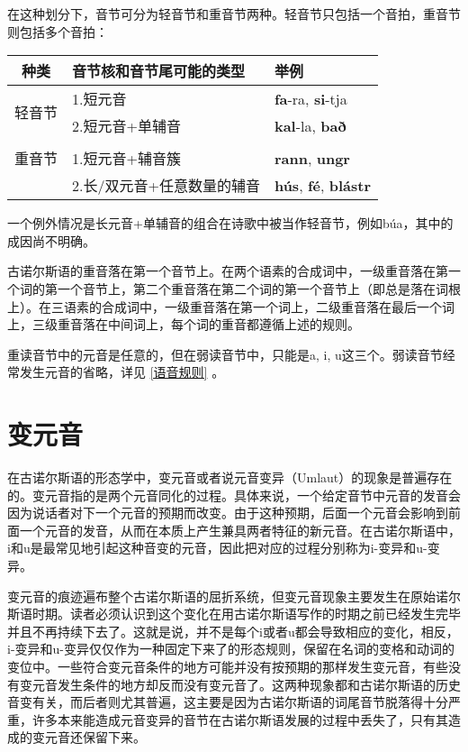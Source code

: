 在这种划分下，音节可分为轻音节和重音节两种。轻音节只包括一个音拍，重音节则包括多个音拍：


\begin{table}[H]
    \centering
    \begin{tabular}{cll}
    \hline
    \textbf{种类}                   & \textbf{音节核和音节尾可能的类型}         & \textbf{举例}                     \\ \hline
    \multirow{2}{*}{轻音节} & 1.短元音                & \textbf{fa}-ra, \textbf{si}-tja \\
                         & 2.短元音+单辅音            & \textbf{kal}-la, \textbf{bað}            \\
    \multicolumn{1}{l}{} & \multicolumn{1}{l}{} & \multicolumn{1}{l}{}   \\
    重音节                  & 1.短元音+辅音簇            & \textbf{rann}, \textbf{ungr}             \\
                         & 2.长/双元音+任意数量的辅音      & \textbf{hús}, \textbf{fé},  \textbf{blástr}               \\ \hline
    \end{tabular}
\end{table}

一个例外情况是长元音+单辅音的组合在诗歌中被当作轻音节，例如búa，其中的成因尚不明确。

古诺尔斯语的重音落在第一个音节上。在两个语素的合成词中，一级重音落在第一个词的第一个音节上，第二个重音落在第二个词的第一个音节上（即总是落在词根上）。在三语素的合成词中，一级重音落在第一个词上，二级重音落在最后一个词上，三级重音落在中间词上，每个词的重音都遵循上述的规则。

重读音节中的元音是任意的，但在弱读音节中，只能是a, i, u这三个。弱读音节经常发生元音的省略，详见 \ref{语音规则} 。

\section{变元音}
\label{变元音}

在古诺尔斯语的形态学中，变元音或者说元音变异（Umlaut）的现象是普遍存在的。变元音指的是两个元音同化的过程。具体来说，一个给定音节中元音的发音会因为说话者对下一个元音的预期而改变。由于这种预期，后面一个元音会影响到前面一个元音的发音，从而在本质上产生兼具两者特征的新元音。在古诺尔斯语中，i和u是最常见地引起这种音变的元音，因此把对应的过程分别称为i-变异和u-变异。

变元音的痕迹遍布整个古诺尔斯语的屈折系统，但变元音现象主要发生在原始诺尔斯语时期。读者必须认识到这个变化在用古诺尔斯语写作的时期之前已经发生完毕并且不再持续下去了。这就是说，并不是每个i或者u都会导致相应的变化，相反，i-变异和u-变异仅仅作为一种固定下来了的形态规则，保留在\textbf{}名词的变格和动词的变位中。一些符合变元音条件的地方可能并没有按预期的那样发生变元音，有些没有变元音发生条件的地方却反而没有变元音了。这两种现象都和古诺尔斯语的历史音变有关，而后者则尤其普遍，这主要是因为古诺尔斯语的词尾音节脱落得十分严重，许多本来能造成元音变异的音节在古诺尔斯语发展的过程中丢失了，只有其造成的变元音还保留下来。

